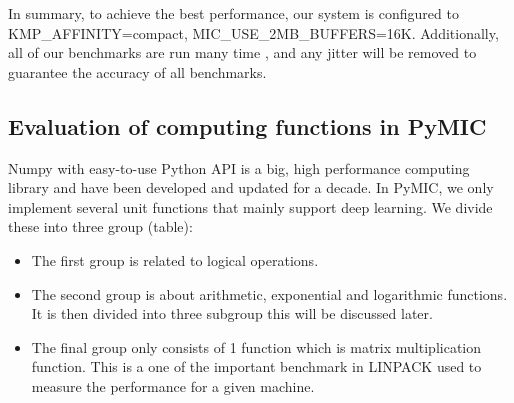 In summary, to achieve the best performance,  our system is configured to KMP\_AFFINITY=compact, MIC\_USE\_2MB\_BUFFERS=16K. Additionally,  all of our benchmarks are run many time , and any jitter will be removed to guarantee the accuracy of all benchmarks.

\subsection{Evaluation of computing functions in PyMIC}
Numpy with easy-to-use Python API is a big, high performance computing library and have been developed and updated for a decade. In PyMIC, we only implement several unit functions that mainly support deep learning. We divide these into three group (table):
\begin{itemize}
	\item The first group is related to logical operations.
	\item The second group is about arithmetic, exponential and logarithmic functions. It is then divided into three subgroup this will be discussed later. 
	\item The final group only consists of 1 function which is matrix multiplication function. This is a one of the important benchmark in LINPACK used to measure the performance for a given machine.
\end{itemize}

